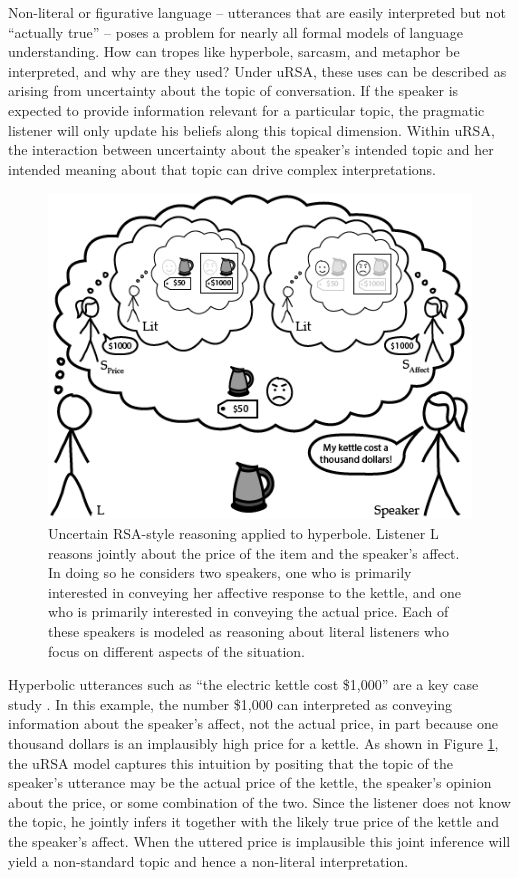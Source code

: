 \documentclass[]{elsarticle}
\begin{document}
Non-literal or figurative language -- utterances that are easily interpreted but not
``actually true'' -- poses a problem for nearly all formal models of language
understanding. How can tropes like
hyperbole, sarcasm, and metaphor be interpreted, and why are they used?
Under uRSA, these uses can be described as arising from uncertainty
about the topic of conversation. If the speaker is expected to provide
information relevant for a particular topic,
the pragmatic listener will only update his beliefs along this topical
dimension. Within uRSA, the interaction between uncertainty about the speaker's
intended topic and her intended meaning about that topic can drive
complex interpretations.

\begin{figure}[ht]
\begin{center}
\includegraphics[width=1.0\textwidth]{images/media/image03.png}
\caption{\label{fig:ursa} Uncertain RSA-style reasoning applied to hyperbole. Listener L reasons jointly about the price of the item and the speaker's affect. In doing so he considers two speakers, one who is primarily interested in conveying her affective response to the kettle, and one who is primarily interested in conveying the actual price. Each of these speakers is modeled as reasoning about literal listeners who focus on different aspects of the situation.}
\end{center}
\end{figure}

Hyperbolic utterances such as ``the
electric kettle cost \$1,000'' are a key case study \citep{kao2014}.
In this example, the number \$1,000 can
interpreted as conveying information about the speaker's affect, not the
actual price, in part because one thousand dollars is an implausibly
high price for a kettle. As shown in Figure \ref{fig:ursa}, the uRSA model  captures this intuition by positing that the topic of the speaker's
utterance may be the actual price of the kettle, the speaker's
opinion about the price, or some combination of the two. Since the listener
does not know the topic, he jointly infers it together with the
likely true price of the kettle and the speaker's affect. When the
uttered price is implausible this joint inference will yield a
non-standard topic and hence a non-literal interpretation.
\end{document}
